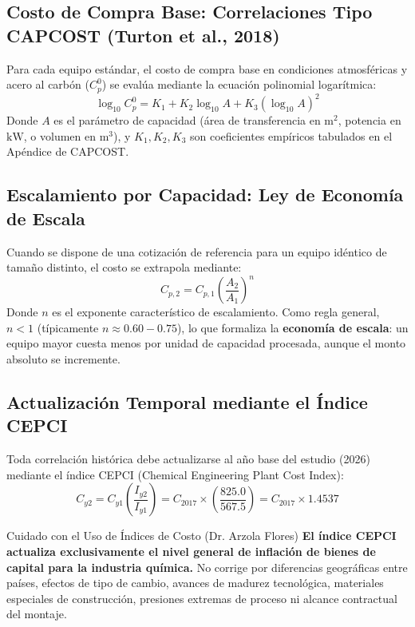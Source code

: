 \documentclass[11pt,letterpaper]{article}
\begin{document}
\subsection{Costo de Compra Base: Correlaciones Tipo CAPCOST (Turton et al., 2018)}
Para cada equipo estándar, el costo de compra base en condiciones atmosféricas y acero al carbón ($C_p^0$) se evalúa mediante la ecuación polinomial logarítmica:
\begin{equation}
    \log_{10} C_p^0 = K_1 + K_2 \log_{10} A + K_3 (\log_{10} A)^2
\end{equation}
Donde $A$ es el parámetro de capacidad (área de transferencia en $\text{m}^2$, potencia en $\text{kW}$, o volumen en $\text{m}^3$), y $K_1, K_2, K_3$ son coeficientes empíricos tabulados en el Apéndice de CAPCOST.

\subsection{Escalamiento por Capacidad: Ley de Economía de Escala}
Cuando se dispone de una cotización de referencia para un equipo idéntico de tamaño distinto, el costo se extrapola mediante:
\begin{equation}
    C_{p,2} = C_{p,1} \left( \frac{A_2}{A_1} \right)^n
\end{equation}
Donde $n$ es el exponente característico de escalamiento. Como regla general, $n < 1$ (típicamente $n \approx 0.60 - 0.75$), lo que formaliza la \textbf{economía de escala}: un equipo mayor cuesta menos por unidad de capacidad procesada, aunque el monto absoluto se incremente.

\subsection{Actualización Temporal mediante el Índice CEPCI}
Toda correlación histórica debe actualizarse al año base del estudio (2026) mediante el índice CEPCI (Chemical Engineering Plant Cost Index):
\begin{equation}
    C_{y2} = C_{y1} \left( \frac{I_{y2}}{I_{y1}} \right) = C_{2017} \times \left( \frac{825.0}{567.5} \right) = C_{2017} \times 1.4537
\end{equation}
\begin{warningbox}{Cuidado con el Uso de Índices de Costo (Dr. Arzola Flores)}
\textbf{El índice CEPCI actualiza exclusivamente el nivel general de inflación de bienes de capital para la industria química.} No corrige por diferencias geográficas entre países, efectos de tipo de cambio, avances de madurez tecnológica, materiales especiales de construcción, presiones extremas de proceso ni alcance contractual del montaje.
\end{warningbox}
\end{document}
